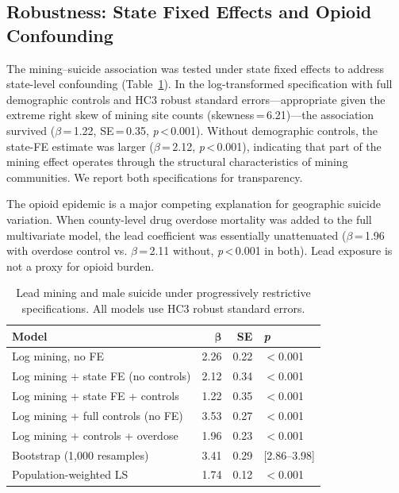 \documentclass[11pt,twocolumn]{article}
\begin{document}
\subsection{Robustness: State Fixed Effects and Opioid Confounding}

The mining--suicide association was tested under state fixed effects to address state-level confounding (Table~\ref{tab:robustness}). In the log-transformed specification with full demographic controls and HC3 robust standard errors---appropriate given the extreme right skew of mining site counts (skewness\,=\,6.21)---the association survived ($\beta$\,=\,1.22, SE\,=\,0.35, \textit{p}\,<\,0.001). Without demographic controls, the state-FE estimate was larger ($\beta$\,=\,2.12, \textit{p}\,<\,0.001), indicating that part of the mining effect operates through the structural characteristics of mining communities. We report both specifications for transparency.

The opioid epidemic is a major competing explanation for geographic suicide variation. When county-level drug overdose mortality was added to the full multivariate model, the lead coefficient was essentially unattenuated ($\beta$\,=\,1.96 with overdose control vs. $\beta$\,=\,2.11 without, \textit{p}\,<\,0.001 in both). Lead exposure is not a proxy for opioid burden.

\begin{table}[H]
\centering
\small
\caption{Lead mining and male suicide under progressively restrictive specifications. All models use HC3 robust standard errors.}
\label{tab:robustness}
\begin{tabular}{@{}lrrl@{}}
\toprule
\textbf{Model} & $\boldsymbol{\beta}$ & \textbf{SE} & \textbf{\textit{p}} \\
\midrule
Log mining, no FE & 2.26 & 0.22 & $<$0.001 \\
Log mining + state FE (no controls) & 2.12 & 0.34 & $<$0.001 \\
Log mining + state FE + controls & 1.22 & 0.35 & $<$0.001 \\
Log mining + full controls (no FE) & 3.53 & 0.27 & $<$0.001 \\
Log mining + controls + overdose & 1.96 & 0.23 & $<$0.001 \\
Bootstrap (1,000 resamples) & 3.41 & 0.29 & [2.86--3.98] \\
Population-weighted LS & 1.74 & 0.12 & $<$0.001 \\
\bottomrule
\end{tabular}
\end{table}
\end{document}
